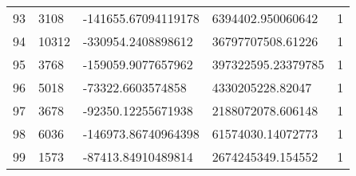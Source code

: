 \begin{longtable}{lllll}
    93 & 3108 & -141655.67094119178 & 6394402.950060642 & 1 \\
    94 & 10312 & -330954.2408898612 & 36797707508.61226 & 1 \\
    95 & 3768 & -159059.9077657962 & 397322595.23379785 & 1 \\
    96 & 5018 & -73322.6603574858 & 4330205228.82047 & 1 \\
    97 & 3678 & -92350.12255671938 & 2188072078.606148 & 1 \\
    98 & 6036 & -146973.86740964398 & 61574030.14072773 & 1 \\
    99 & 1573 & -87413.84910489814 & 2674245349.154552 & 1
\end{longtable}